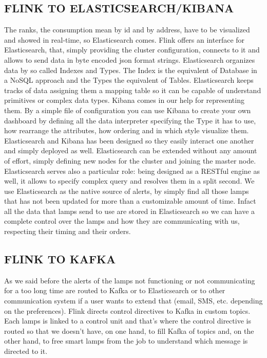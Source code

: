 \subsection{FLINK TO ELASTICSEARCH/KIBANA}
The ranks, the consumption mean by id and by address, have to be visualized and showed in real-time, so Elasticsearch comes. Flink offers an interface for Elasticsearch, that, simply providing the cluster configuration, connects to it and allows to send data in byte encoded json format strings. Elasticsearch organizes data by so called Indexes and Types. The Index is the equivalent of Database in a NoSQL approach and the Types the equivalent of Tables. Elasticsearch keeps tracks of data assigning them a mapping table so it can be capable of understand primitives or complex data types. Kibana comes in our help for representing them. By a simple file of configuration you can use Kibana to create your own dashboard by defining all the data interpreter specifying the Type it has to use, how rearrange the attributes, how ordering and in which style visualize them. Elasticsearch and Kibana has been designed so they easily interact one another and simply deployed as well. Elasticsearch can be extended without any amount of effort, simply defining new nodes for the cluster and joining the master node. Elasticsearch serves also a particular role: being designed as a RESTful engine as well, it allows to specify complex query and resolves them in a split second. We use Elasticsearch as the native source of alerts, by simply find all those lamps that has not been updated for more than a customizable amount of time. Infact all the data that lamps send to use are stored in Elasticsearch so we can have a complete control over the lamps and how they are communicating with us, respecting their timing and their orders.

\subsection{FLINK TO KAFKA}
As we said before the alerts of the lamps not functioning or not communicating for a too long time are routed to Kafka or to Elasticsearch or to other communication system if a user wants to extend that (email, SMS, etc. depending on the preferences). Flink directs control directives to Kafka in custom topics. Each lamps is linked to a control unit and that’s where the control directive is routed so that we doesn’t have, on one hand, to fill Kafka of topics and, on the other hand, to free smart lamps from the job to understand which message is directed to it. 

